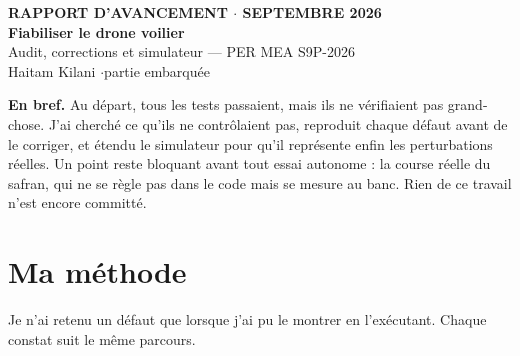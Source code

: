 \documentclass[11pt,a4paper]{article}
\begin{document}
\begin{tcolorbox}[enhanced,colback=accent,colframe=accent,coltext=white,arc=3pt,
  left=16pt,right=16pt,top=14pt,bottom=14pt,boxrule=0pt]
{\sffamily\footnotesize\bfseries\color{white!80!accent} RAPPORT D'AVANCEMENT \quad$\cdot$ SEPTEMBRE 2026}\\[0.5em]
{\sffamily\Huge\bfseries\color{white} Fiabiliser le drone voilier}\\[0.15em]
{\sffamily\large\color{white} Audit, corrections et simulateur --- PER MEA S9P-2026}\\[0.6em]
{\sffamily\small\color{white} Haitam Kilani \quad$\cdot$\quad partie embarquée}
\end{tcolorbox}

\vspace{0.3em}
\begin{info}
\textbf{En bref.} Au départ, tous les tests passaient, mais ils ne vérifiaient pas grand-chose. J'ai cherché ce qu'ils ne
contrôlaient pas, reproduit chaque défaut avant de le corriger, et étendu le simulateur pour qu'il représente enfin les
perturbations réelles. Un point reste bloquant avant tout essai autonome : la course réelle du safran, qui ne se règle
pas dans le code mais se mesure au banc. Rien de ce travail n'est encore committé.
\end{info}

\section{Ma méthode}

Je n'ai retenu un défaut que lorsque j'ai pu le montrer en l'exécutant. Chaque constat suit le même parcours.

\vspace{0.3em}
\begin{center}
\end{center}
\end{document}
